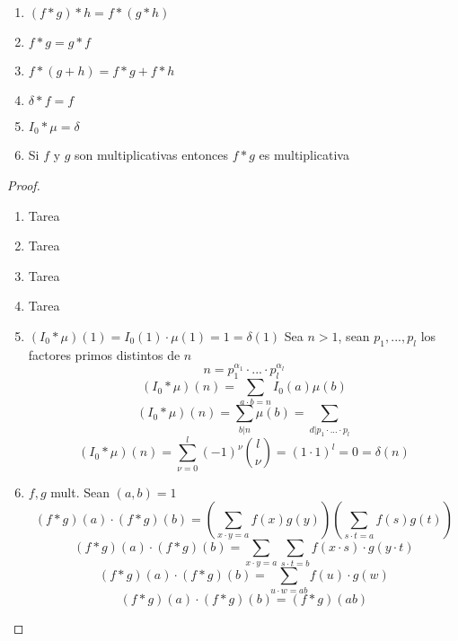     \begin{thm}
        \begin{enumerate}[label=(\alph*)]
            \item $(f*g)*h=f*(g*h)$

            \item $f*g=g*f$

            \item $f*(g+h)=f*g+f*h$

            \item $\delta*f=f$

            \item $I_0*\mu=\delta$

            \item Si $f$ y $g$ son multiplicativas entonces $f*g$ es multiplicativa
        \end{enumerate}
    \end{thm}
    \begin{proof}
        \
        \begin{enumerate}[label=(\alph*)]
            \item Tarea

            \item Tarea

            \item Tarea

            \item Tarea

            \item $(I_0*\mu)(1)=I_0(1)\cdot\mu(1)=1=\delta(1)$
            Sea $n>1$, sean $p_1,...,p_l$ los factores primos distintos de $n$
            \[n=p_1^{\alpha_1}\cdot...\cdot p_l^{\alpha_l}\]
            \[(I_0*\mu)(n)=\sum_{a\cdot b=n}I_0(a)\mu(b)\]
            \[(I_0*\mu)(n)=\sum_{b|n}\mu(b)=\sum_{d|p_1\cdot...\cdot p_l}\]
            \[(I_0*\mu)(n)=\sum_{\nu=0}^l(-1)^\nu\binom{l}{\nu}=(1\cdot 1)^l=0=\delta(n)\]

            \item $f,g$ mult. Sean $(a,b)=1$
            \[(f*g)(a)\cdot(f*g)(b)=\left(\sum_{x\cdot y=a}f(x)g(y)\right)\left(\sum_{s\cdot t=a}f(s)g(t)\right)\]
            \[(f*g)(a)\cdot(f*g)(b)=\sum_{x\cdot y=a}\sum_{s\cdot t=b}f(x\cdot s)\cdot g(y\cdot t)\]
            \[(f*g)(a)\cdot(f*g)(b)=\sum_{u\cdot w=ab}f(u)\cdot g(w)\]
            \[(f*g)(a)\cdot(f*g)(b)=(f*g)(ab)\]
        \end{enumerate}
    \end{proof}
